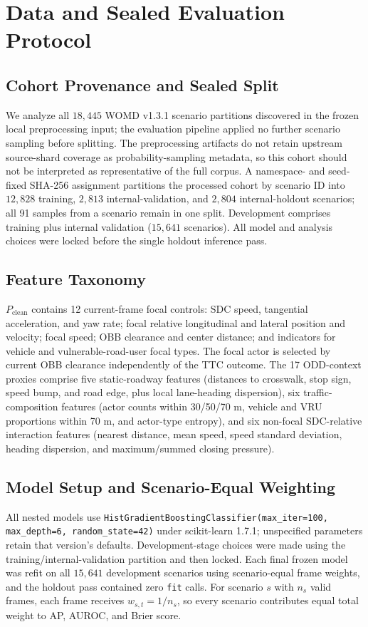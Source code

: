 \section{Data and Sealed Evaluation Protocol}
\label{sec:data_protocol}

\subsection{Cohort Provenance and Sealed Split}
We analyze all $18,445$ WOMD v1.3.1 scenario partitions discovered in the frozen local preprocessing input; the evaluation pipeline applied no further scenario sampling before splitting. The preprocessing artifacts do not retain upstream source-shard coverage as probability-sampling metadata, so this cohort should not be interpreted as representative of the full corpus. A namespace- and seed-fixed SHA-256 assignment partitions the processed cohort by scenario ID into $12,828$ training, $2,813$ internal-validation, and $2,804$ internal-holdout scenarios; all 91 samples from a scenario remain in one split. Development comprises training plus internal validation ($15,641$ scenarios). All model and analysis choices were locked before the single holdout inference pass.

\subsection{Feature Taxonomy}
$P_{\mathrm{clean}}$ contains 12 current-frame focal controls: SDC speed, tangential acceleration, and yaw rate; focal relative longitudinal and lateral position and velocity; focal speed; OBB clearance and center distance; and indicators for vehicle and vulnerable-road-user focal types. The focal actor is selected by current OBB clearance independently of the TTC outcome. The 17 ODD-context proxies comprise five static-roadway features (distances to crosswalk, stop sign, speed bump, and road edge, plus local lane-heading dispersion), six traffic-composition features (actor counts within 30/50/70 m, vehicle and VRU proportions within 70 m, and actor-type entropy), and six non-focal SDC-relative interaction features (nearest distance, mean speed, speed standard deviation, heading dispersion, and maximum/summed closing pressure).

\subsection{Model Setup and Scenario-Equal Weighting}
All nested models use \texttt{HistGradientBoostingClassifier(max\_iter=100, max\_depth=6, random\_state=42)} under scikit-learn 1.7.1; unspecified parameters retain that version's defaults. Development-stage choices were made using the training/internal-validation partition and then locked. Each final frozen model was refit on all $15,641$ development scenarios using scenario-equal frame weights, and the holdout pass contained zero \texttt{fit} calls. For scenario $s$ with $n_s$ valid frames, each frame receives $w_{s,t} = 1 / n_s$, so every scenario contributes equal total weight to AP, AUROC, and Brier score.

